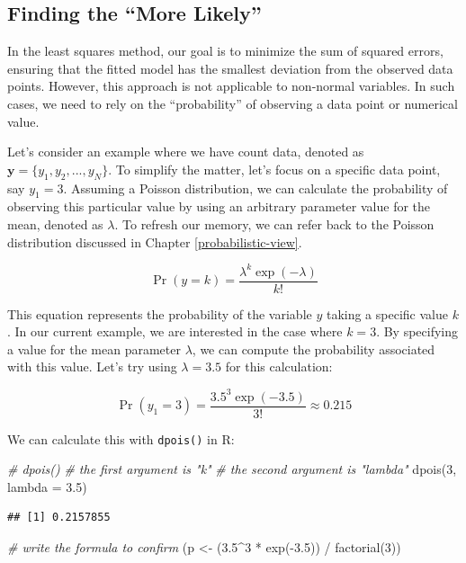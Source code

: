 \documentclass[
]{article}
\newenvironment{Shaded}{\begin{snugshade}}{\end{snugshade}}
\newcommand{\AttributeTok}[1]{\textcolor[rgb]{0.77,0.63,0.00}{#1}}
\newcommand{\CommentTok}[1]{\textcolor[rgb]{0.56,0.35,0.01}{\textit{#1}}}
\newcommand{\DecValTok}[1]{\textcolor[rgb]{0.00,0.00,0.81}{#1}}
\newcommand{\FloatTok}[1]{\textcolor[rgb]{0.00,0.00,0.81}{#1}}
\newcommand{\FunctionTok}[1]{\textcolor[rgb]{0.00,0.00,0.00}{#1}}
\newcommand{\NormalTok}[1]{#1}
\newcommand{\OtherTok}[1]{\textcolor[rgb]{0.56,0.35,0.01}{#1}}
\newcommand{\SpecialCharTok}[1]{\textcolor[rgb]{0.00,0.00,0.00}{#1}}
\begin{document}
\hypertarget{finding-the-more-likely}{%
\subsection{Finding the ``More Likely''}\label{finding-the-more-likely}}

In the least squares method, our goal is to minimize the sum of squared errors, ensuring that the fitted model has the smallest deviation from the observed data points. However, this approach is not applicable to non-normal variables. In such cases, we need to rely on the ``probability'' of observing a data point or numerical value.

Let's consider an example where we have count data, denoted as \(\pmb{y} = \{y_1, y_2, ..., y_N\}\). To simplify the matter, let's focus on a specific data point, say \(y_1 = 3\). Assuming a Poisson distribution, we can calculate the probability of observing this particular value by using an arbitrary parameter value for the mean, denoted as \(\lambda\). To refresh our memory, we can refer back to the Poisson distribution discussed in Chapter \ref{probabilistic-view}.

\[
\Pr(y = k) = \frac{\lambda^{k}\exp(-\lambda)}{k!}
\]

This equation represents the probability of the variable \(y\) taking a specific value \(k\). In our current example, we are interested in the case where \(k = 3\). By specifying a value for the mean parameter \(\lambda\), we can compute the probability associated with this value. Let's try using \(\lambda = 3.5\) for this calculation:

\[
\Pr(y_1 = 3) = \frac{3.5^3 \exp(-3.5)}{3!} \approx 0.215
\]

We can calculate this with \texttt{dpois()} in R:

\begin{Shaded}
\begin{Highlighting}[]
\CommentTok{\# dpois()}
\CommentTok{\# the first argument is "k"}
\CommentTok{\# the second argument is "lambda"}
\FunctionTok{dpois}\NormalTok{(}\DecValTok{3}\NormalTok{, }\AttributeTok{lambda =} \FloatTok{3.5}\NormalTok{)}
\end{Highlighting}
\end{Shaded}

\begin{verbatim}
## [1] 0.2157855
\end{verbatim}

\begin{Shaded}
\begin{Highlighting}[]
\CommentTok{\# write the formula to confirm}
\NormalTok{(p }\OtherTok{\textless{}{-}}\NormalTok{ (}\FloatTok{3.5}\SpecialCharTok{\^{}}\DecValTok{3} \SpecialCharTok{*} \FunctionTok{exp}\NormalTok{(}\SpecialCharTok{{-}}\FloatTok{3.5}\NormalTok{)) }\SpecialCharTok{/} \FunctionTok{factorial}\NormalTok{(}\DecValTok{3}\NormalTok{))}
\end{Highlighting}
\end{Shaded}
\end{document}
